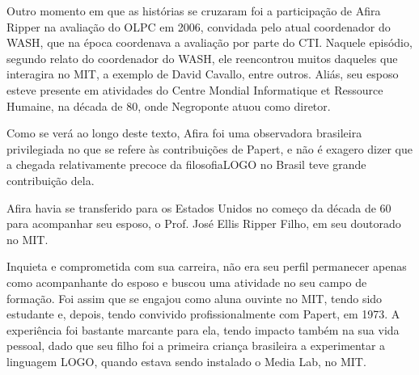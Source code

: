 \documentclass[
12pt,		%
openright,	%
twoside,  %
a4paper,			%
chapter=TITLE,		%
english,			%
french,				%
spanish,			%
brazil				%
]{USPSC-classe/USPSC}
\begin{document}
Outro momento em que as hist\'orias se cruzaram foi a participa\c{c}\~ao de Afira Ripper na avalia\c{c}\~ao do OLPC em 2006, convidada pelo atual coordenador do WASH, que na \'epoca coordenava a avalia\c{c}\~ao por parte do CTI. Naquele epis\'odio, segundo relato do coordenador do WASH, ele reencontrou muitos daqueles que interagira no MIT, a exemplo de David Cavallo, entre outros. Ali\'as, seu esposo esteve presente em atividades do Centre Mondial Informatique et Ressource Humaine, na d\'ecada de 80, onde Negroponte atuou como diretor.

















Como se ver\'a ao longo deste texto, Afira foi uma observadora brasileira privilegiada no que se refere \`as contribui\c{c}\~oes de Papert, e n\~ao \'e exagero dizer que a chegada relativamente precoce da \textquotedbl filosofia\textquotedbl  LOGO no Brasil teve grande contribui\c{c}\~ao dela.

















Afira havia se transferido para os Estados Unidos no come\c{c}o da d\'ecada de 60 para acompanhar seu esposo, o Prof. Jos\'e Ellis Ripper Filho, em seu doutorado no MIT.

















Inquieta e comprometida com sua carreira, n\~ao era seu perfil permanecer apenas como acompanhante do esposo e buscou uma atividade no seu campo de forma\c{c}\~ao. Foi assim que se engajou como aluna ouvinte no MIT, tendo sido estudante e, depois, tendo convivido profissionalmente com Papert, em 1973. A experi\^encia foi bastante marcante para ela, tendo impacto tamb\'em na sua vida pessoal, dado que seu filho foi a primeira crian\c{c}a brasileira a experimentar a linguagem LOGO, quando estava sendo instalado o Media Lab, no MIT.
\end{document}
